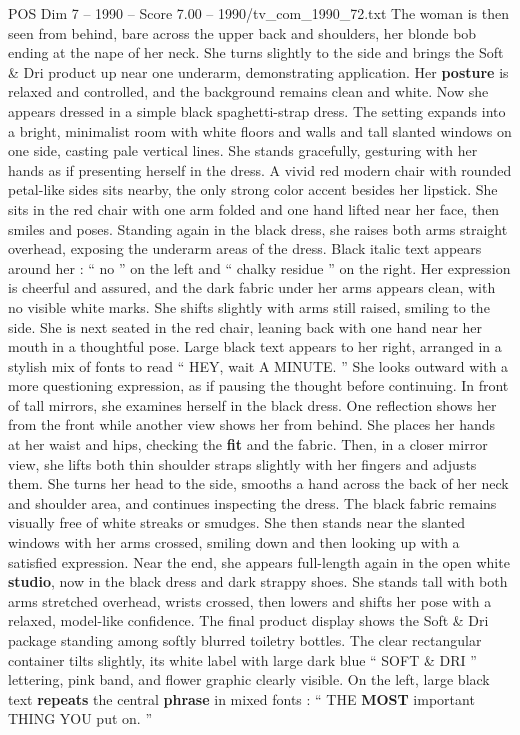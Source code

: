 \begin{textsample}{POS Dim 7 – 1990 – Score 7.00 – 1990/tv\_com\_1990\_72.txt}
The woman is then seen from behind, bare across the upper back and shoulders, her blonde bob ending at the nape of her neck.
She turns slightly to the side and brings the Soft \& Dri product up near one underarm, demonstrating application.
Her \textbf{posture} is relaxed and controlled, and the background remains clean and white.
Now she appears dressed in a simple black spaghetti-strap dress.
The setting expands into a bright, minimalist room with white floors and walls and tall slanted windows on one side, casting pale vertical lines.
She stands gracefully, gesturing with her hands as if presenting herself in the dress.
A vivid red modern chair with rounded petal-like sides sits nearby, the only strong color accent besides her lipstick.
She sits in the red chair with one arm folded and one hand lifted near her face, then smiles and poses.
Standing again in the black dress, she raises both arms straight overhead, exposing the underarm areas of the dress.
Black italic text appears around her : “ no ” on the left and “ chalky residue ” on the right.
Her expression is cheerful and assured, and the dark fabric under her arms appears clean, with no visible white marks.
She shifts slightly with arms still raised, smiling to the side.
She is next seated in the red chair, leaning back with one hand near her mouth in a thoughtful pose.
Large black text appears to her right, arranged in a stylish mix of fonts to read “ HEY, wait A MINUTE. ” She looks outward with a more questioning expression, as if pausing the thought before continuing.
In front of tall mirrors, she examines herself in the black dress.
One reflection shows her from the front while another view shows her from behind.
She places her hands at her waist and hips, checking the \textbf{fit} and the fabric.
Then, in a closer mirror view, she lifts both thin shoulder straps slightly with her fingers and adjusts them.
She turns her head to the side, smooths a hand across the back of her neck and shoulder area, and continues inspecting the dress.
The black fabric remains visually free of white streaks or smudges.
She then stands near the slanted windows with her arms crossed, smiling down and then looking up with a satisfied expression.
Near the end, she appears full-length again in the open white \textbf{studio}, now in the black dress and dark strappy shoes.
She stands tall with both arms stretched overhead, wrists crossed, then lowers and shifts her pose with a relaxed, model-like confidence.
The final product display shows the Soft \& Dri package standing among softly blurred toiletry bottles.
The clear rectangular container tilts slightly, its white label with large dark blue “ SOFT \& DRI ” lettering, pink band, and flower graphic clearly visible.
On the left, large black text \textbf{repeats} the central \textbf{phrase} in mixed fonts : “ THE \textbf{MOST} important THING YOU put on. ”

\end{textsample}
